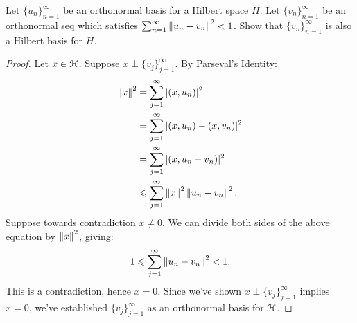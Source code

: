 \documentclass[10pt,oneside,openany]{memoir}
\begin{document}
\begin{exercise}
Let $\{u_n\}_{n = 1}^\infty$ be an orthonormal basis for a Hilbert space $H$. Let $\{v_n\}_{n = 1}^\infty$ be an orthonormal seq which satisfies $\sum_{n = 1}^\infty \left\lVert u_n - v_n \right\rVert^2 < 1$. Show that $\{v_n\}_{n = 1}^\infty$ is also a Hilbert basis for $H$.
\end{exercise}
    \begin{proof}
    Let $x \in \mathcal{H}$. Suppose $x \perp \{v_j\}_{j = 1}^\infty$. By Parseval's Identity:
        \begin{equation*}
        \begin{split}
            \left\lVert x \right\rVert^2 
            & = \sum_{j = 1}^\infty |(x,u_n)|^2 \\
            & = \sum_{j = 1}^\infty |(x,u_n) - (x,v_n)|^2 \\
            & = \sum_{j = 1}^\infty |(x,u_n - v_n)|^2 \\
            & \leqslant \sum_{j = 1}^\infty \left\lVert x \right\rVert^2 \left\lVert u_n - v_n \right\rVert^2.
        \end{split}
        \end{equation*}
    Suppose towards contradiction $x \neq 0$. We can divide both sides of the above equation by $\left\lVert x \right\rVert^2$, giving:
        \begin{equation*}
        \begin{split}
            1 \leqslant \sum_{j = 1}^\infty \left\lVert u_n - v_n \right\rVert^2 < 1.
        \end{split}
        \end{equation*}
    This is a contradiction, hence $x = 0$. Since we've shown $x \perp \{v_j\}_{j = 1}^\infty$ implies $x = 0$, we've established $\{v_j\}_{j = 1}^\infty$ as an orthonormal basis for $\mathcal{H}$.
    \end{proof}
\end{document}
